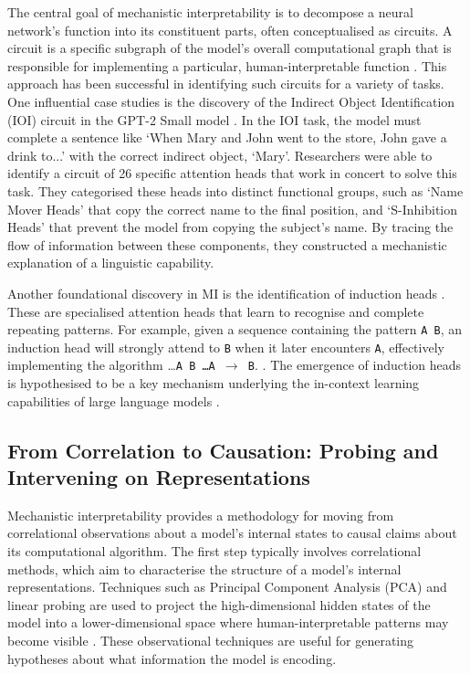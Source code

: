 The central goal of mechanistic interpretability is to decompose a neural network's function into its constituent parts, often conceptualised as circuits. A circuit is a specific subgraph of the model's overall computational graph that is responsible for implementing a particular, human-interpretable function \cite{rai2025}.  This approach has been successful in identifying such circuits for a variety of tasks. One influential case studies is the discovery of the Indirect Object Identification (IOI) circuit in the GPT-2 Small model \cite{wang2022ioi}. In the IOI task, the model must complete a sentence like `When Mary and John went to the store, John gave a drink to...' with the correct indirect object, `Mary'. Researchers were able to identify a circuit of 26 specific attention heads that work in concert to solve this task. They categorised these heads into distinct functional groups, such as `Name Mover Heads' that copy the correct name to the final position, and `S-Inhibition Heads' that prevent the model from copying the subject's name. By tracing the flow of information between these components, they constructed a mechanistic explanation of a linguistic capability.

Another foundational discovery in MI is the identification of induction heads \cite{olsson2022context}. These are specialised attention heads that learn to recognise and complete repeating patterns. For example, given a sequence containing the pattern \texttt{A B}, an induction head will strongly attend to \texttt{B} when it later encounters \texttt{A}, effectively implementing the algorithm \dots \texttt{A B \dots A $\rightarrow$ B}.
\cite{olsson2022context}. The emergence of induction heads is hypothesised to be a key mechanism underlying the in-context learning capabilities of large language models \cite{chen2025suddendropsloss}.

\subsection{From Correlation to Causation: Probing and Intervening on Representations}

Mechanistic interpretability provides a methodology for moving from correlational observations about a model's internal states to causal claims about its computational algorithm. The first step typically involves correlational methods, which aim to characterise the structure of a model's internal representations. Techniques such as Principal Component Analysis (PCA) and linear probing are used to project the high-dimensional hidden states of the model into a lower-dimensional space where human-interpretable patterns may become visible \citep{alain2018understandingintermediatelayersusing}. These observational techniques are useful for generating hypotheses about what information the model is encoding.


